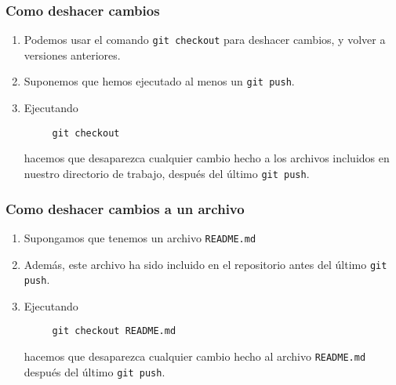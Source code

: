 \documentclass{beamer}
\begin{document}
\begin{frame}[fragile]
\frametitle{Como deshacer cambios}
 
\begin{enumerate}
  \item Podemos usar el comando \verb-git checkout- para deshacer cambios, y volver a versiones anteriores.
  \item Suponemos que hemos ejecutado al menos un \verb-git push-.
  \item Ejecutando
  \begin{verbatim}
     git checkout
  \end{verbatim}
  hacemos que desaparezca cualquier cambio hecho a los archivos 
  incluidos en nuestro directorio de trabajo, después del último \verb-git push-.
\end{enumerate}

\end{frame}

\begin{frame}[fragile]
\frametitle{Como deshacer cambios a un archivo}
 
\begin{enumerate}
  \item Supongamos que tenemos un archivo \verb-README.md-
  \item Además, este archivo ha sido incluido en el repositorio antes del último \verb-git push-.
  \item Ejecutando
  \begin{verbatim}
     git checkout README.md
  \end{verbatim}
  hacemos que desaparezca cualquier cambio hecho al archivo \verb-README.md- 
  después del último \verb-git push-.
\end{enumerate}

\end{frame}
\end{document}
